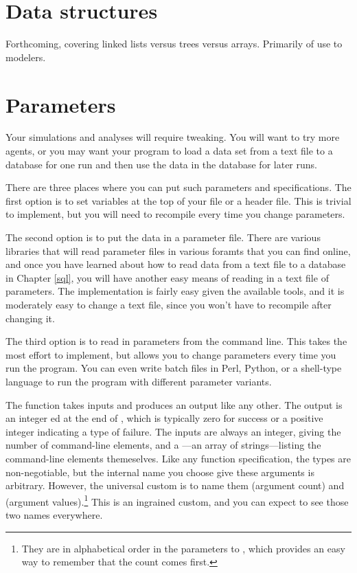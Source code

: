 \section{Data structures} Forthcoming, covering linked lists versus trees versus arrays. Primarily of use to modelers.

\section{Parameters} 
Your simulations and analyses will require
tweaking. You will want to try more agents, or you may want your program
to load a data set from a text file to a database for one run and then
use the data in the database for later runs.

There are three places where you can put such parameters and
specifications. The first option is to set variables at the top of your 
file or a header file. This is trivial to implement, but you will need
to recompile every time you change parameters.

The second option is to put the data in a parameter file. There are
various libraries that will read parameter files in various foramts that
you can find online, and once you have learned about how to read data
from a text file to a database in Chapter \ref{sql}, you will have
another easy means of reading in a text file of parameters. 
The implementation is fairly easy given the available tools, and it is
moderately easy to change a text file, since you won't have to recompile
after changing it.

The third option is to read in parameters from the command line. This
takes the most effort to implement, but allows you to change parameters
every time you run the program. You can even write batch files in Perl,
Python, or a shell-type language to run the program with different parameter variants.

The  function takes inputs and produces an output like any
other. The output is an integer ed at the end of ,
which is typically zero for success or a positive integer indicating
a type of failure. The inputs are always an integer, giving the number
of command-line elements, and a ---an array of
strings---listing the command-line elements themeselves. 
Like any function specification, the types are non-negotiable, but the
internal name you choose give these arguments is arbitrary. However, the
universal custom is to name them  (argument count) and
 (argument values).\footnote{They are in alphabetical order
in the parameters to , which provides an easy way to remember
that the count comes first.} This is an ingrained custom, and you can
expect to see those two names everywhere.

